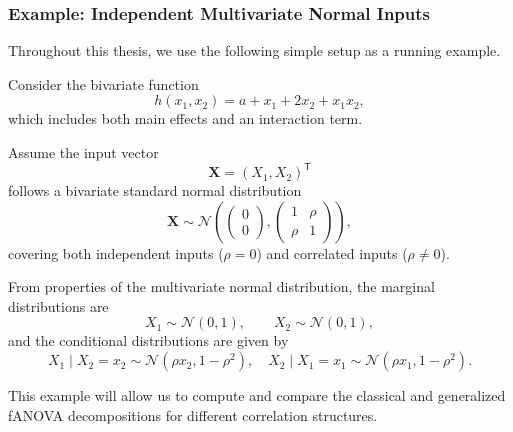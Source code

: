 \subsubsection{Example: Independent Multivariate Normal Inputs}

Throughout this thesis, we use the following simple setup as a running example.

\begin{example}\label{ex:running_example}
Consider the bivariate function
\begin{equation}\label{eq:running_example_function}
    h(x_1, x_2) = a + x_1 + 2x_2 + x_1 x_2,
\end{equation}
which includes both main effects and an interaction term.

Assume the input vector
\[
\boldsymbol{X} = (X_1, X_2)^\mathsf{T}
\]
follows a bivariate standard normal distribution
\[
\boldsymbol{X} \sim \mathcal{N}\!\left(
\begin{pmatrix}0 \\ 0\end{pmatrix},
\begin{pmatrix}
1 & \rho \\ 
\rho & 1
\end{pmatrix}
\right),
\]
covering both independent inputs ($\rho = 0$) and correlated inputs ($\rho \neq 0$).

From properties of the multivariate normal distribution, the marginal distributions are
\[
X_1 \sim \mathcal{N}(0,1), \qquad X_2 \sim \mathcal{N}(0,1),
\]
and the conditional distributions are given by
\[
X_1 \mid X_2=x_2 \sim \mathcal{N}(\rho x_2, 1-\rho^2), \quad
X_2 \mid X_1=x_1 \sim \mathcal{N}(\rho x_1, 1-\rho^2).
\]
\end{example}



This example will allow us to compute and compare the classical and generalized fANOVA decompositions for different correlation structures.\par

